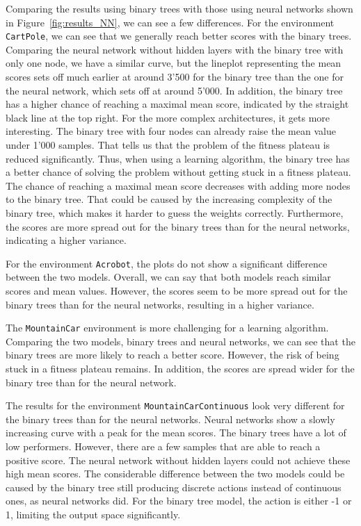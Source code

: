 Comparing the results using binary trees with those using neural networks shown in Figure~\ref{fig:results_NN}, we can see a few differences. For the environment \verb|CartPole|, we can see that we generally reach  better scores with the binary trees. Comparing the neural network without hidden layers with the binary tree with only one node, we have a similar curve, but the lineplot representing the mean scores sets off much earlier at around 3'500 for the binary tree than the one for the neural network, which sets off at around 5'000. In addition, the binary tree has a higher chance of reaching a maximal mean score, indicated by the straight black line at the top right. For the more complex architectures, it gets more interesting. The binary tree with four nodes can already raise the mean value under 1'000 samples. That tells us that the problem of the fitness plateau is reduced significantly. Thus, when using a learning algorithm, the binary tree has a better chance of solving the problem without getting stuck in a fitness plateau. The chance of reaching a maximal mean score decreases with adding more nodes to the binary tree. That could be caused by the increasing complexity of the binary tree, which makes it harder to guess the weights correctly. Furthermore, the scores are more spread out for the binary trees than for the neural networks, indicating a higher variance.

For the environment \verb|Acrobot|, the plots do not show a significant difference between the two models. Overall, we can say that both models reach similar scores and mean values. However, the scores seem to be more spread out for the binary trees than for the neural networks, resulting in a higher variance.

The \verb|MountainCar| environment is more challenging for a learning algorithm. Comparing the two models, binary trees and neural networks, we can see that the binary trees are more likely to reach a better score. However, the risk of being stuck in a fitness plateau remains. In addition, the scores are spread wider for the binary tree than for the neural network.

The results for the environment \verb|MountainCarContinuous| look very different for the binary trees than for the neural networks. Neural networks show a slowly increasing curve with a peak for the mean scores. The binary trees have a lot of low performers. However, there are a few samples that are able to reach a positive score. The neural network without hidden layers could not achieve these high mean scores. The considerable difference between the two models could be caused by the binary tree still producing discrete actions instead of continuous ones, as neural networks did. For the binary tree model, the action is either -1 or 1, limiting the output space significantly.


